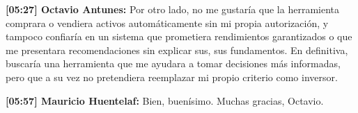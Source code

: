 \par\noindent\textbf{[05:27] Octavio Antunes:} Por otro lado, no me gustaría que la herramienta comprara o vendiera activos automáticamente sin mi propia autorización, y tampoco confiaría en un sistema que prometiera rendimientos garantizados o que me presentara recomendaciones sin explicar sus, sus fundamentos. En definitiva, buscaría una herramienta que me ayudara a tomar decisiones más informadas, pero que a su vez no pretendiera reemplazar mi propio criterio como inversor.
\par\noindent\textbf{[05:57] Mauricio Huentelaf:} Bien, buenísimo. Muchas gracias, Octavio.
